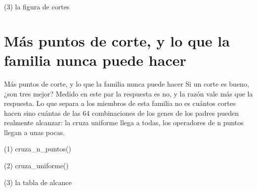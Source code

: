 \begin{frame}[fragile]{(3) la figura de cortes}

\end{frame}



\section{Más puntos de corte, y lo que la familia nunca puede hacer}

\begin{frame}{Más puntos de corte, y lo que la familia nunca puede hacer}
Si un corte es bueno, ¿son tres mejor? Medido en este par la respuesta es no,
y la razón vale más que la respuesta. Lo que separa a los miembros de esta
familia no es cuántos cortes hacen sino cuántas de las 64 combinaciones de los
genes de los padres pueden realmente alcanzar: la cruza uniforme llega a todas,
los operadores de n puntos llegan a unas pocas.
\end{frame}

\begin{frame}[fragile]{(1) cruza\_n\_puntos()}

\end{frame}

\begin{frame}[fragile]{(2) cruza\_uniforme()}

\end{frame}

\begin{frame}[fragile]{(3) la tabla de alcance}

\end{frame}

